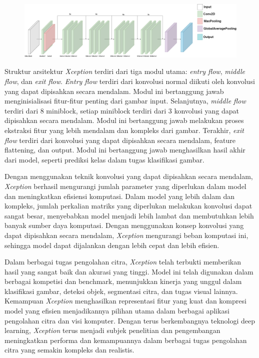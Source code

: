 \begin{figure}[!hbt]
  \centering
  \includegraphics[width=0.8\linewidth]{gambar/bener/Arsitektur_CNNXception.png}
  \label{fig:ArsitekturXception}
\end{figure}
Struktur arsitektur \textit{Xception} terdiri dari tiga modul utama: \textit{entry flow}, \textit{middle flow}, dan \textit{exit flow}. \textit{Entry flow} terdiri dari konvolusi normal diikuti oleh konvolusi yang dapat dipisahkan secara mendalam. Modul ini bertanggung jawab menginisialisasi fitur-fitur penting dari gambar input. Selanjutnya, \textit{middle flow} terdiri dari 8 miniblock, setiap miniblock terdiri dari 3 konvolusi yang dapat dipisahkan secara mendalam. Modul ini bertanggung jawab melakukan proses ekstraksi fitur yang lebih mendalam dan kompleks dari gambar. Terakhir, \textit{exit flow} terdiri dari konvolusi yang dapat dipisahkan secara mendalam, feature flattening, dan output. Modul ini bertanggung jawab menghasilkan hasil akhir dari model, seperti prediksi kelas dalam tugas klasifikasi gambar.

Dengan menggunakan teknik konvolusi yang dapat dipisahkan secara mendalam, \textit{Xception} berhasil mengurangi jumlah parameter yang diperlukan dalam model dan meningkatkan efisiensi komputasi. Dalam model yang lebih dalam dan kompleks, jumlah perkalian matriks yang diperlukan melakukan konvolusi dapat sangat besar, menyebabkan model menjadi lebih lambat dan membutuhkan lebih banyak sumber daya komputasi. Dengan menggunakan konsep konvolusi yang dapat dipisahkan secara mendalam, \textit{Xception} mengurangi beban komputasi ini, sehingga model dapat dijalankan dengan lebih cepat dan lebih efisien.

Dalam berbagai tugas pengolahan citra, \textit{Xception} telah terbukti memberikan hasil yang sangat baik dan akurasi yang tinggi. Model ini telah digunakan dalam berbagai kompetisi dan benchmark, menunjukkan kinerja yang unggul dalam klasifikasi gambar, deteksi objek, segmentasi citra, dan tugas visual lainnya. Kemampuan \textit{Xception} menghasilkan representasi fitur yang kuat dan kompresi model yang efisien menjadikannya pilihan utama dalam berbagai aplikasi pengolahan citra dan visi komputer. Dengan terus berkembangnya teknologi deep learning, \textit{Xception} terus menjadi subjek penelitian dan pengembangan meningkatkan performa dan kemampuannya dalam berbagai tugas pengolahan citra yang semakin kompleks dan realistis.



